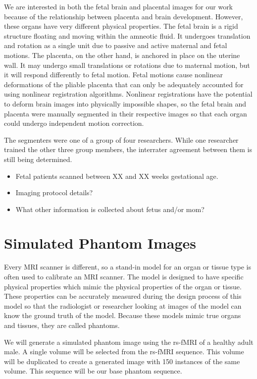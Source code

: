 We are interested in both the fetal brain and placental images for our work because of the relationship between placenta and brain development. However, these organs have very different physical properties. The fetal brain is a rigid structure floating and moving within the amneotic fluid. It undergoes translation and rotation as a single unit due to passive and active maternal and fetal motions. The placenta, on the other hand, is anchored in place on the uterine wall. It may undergo small translations or rotations due to maternal motion, but it will respond differently to fetal motion. Fetal motions cause nonlinear deformations of the pliable placenta that can only be adequately accounted for using nonlinear registration algorithms. Nonlinear registrations have the potential to deform brain images into physically impossible shapes, so the fetal brain and placenta were manually segmented in their respective images so that each organ could undergo independent motion correction. 

The segmenters were one of a group of four researchers. While one researcher trained the other three group members, the interrater agreement between them is still being determined.

\begin{itemize}
\item Fetal patients scanned between XX and XX weeks gestational age. 
\item Imaging protocol details?
\item What other information is collected about fetus and/or mom?
\end{itemize}


\section{Simulated Phantom Images}

Every MRI scanner is different, so a stand-in model for an organ or tissue type is often used to calibrate an MRI scanner. The model is designed to have specific physical properties which mimic the physical properties of the organ or tissue. These properties can be accurately measured during the design process of this model so that the radiologist or researcher looking at images of the model can know the ground truth of the model. Because these models mimic true organs and tissues, they are called phantoms. 

We will generate a simulated phantom image using the rs-fMRI of a healthy adult male. A single volume will be selected from the rs-fMRI sequence. This volume will be duplicated to create a generated image with 150 instances of the same volume. This sequence will be our base phantom sequence. 

